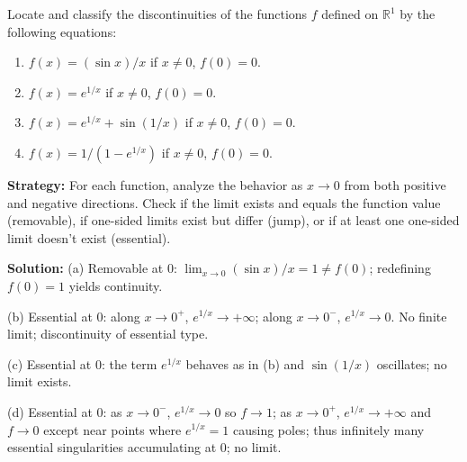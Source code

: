 \begin{problembox}
\begin{problemstatement}
Locate and classify the discontinuities of the functions $f$ defined on $\mathbb{R}^1$ by the following equations:
\begin{enumerate}[label=(\alph*)]
\item $f(x) = (\sin x)/x$ if $x \neq 0$, $f(0) = 0$.
\item $f(x) = e^{1/x}$ if $x \neq 0$, $f(0) = 0$.
\item $f(x) = e^{1/x} + \sin(1/x)$ if $x \neq 0$, $f(0) = 0$.
\item $f(x) = 1/(1 - e^{1/x})$ if $x \neq 0$, $f(0) = 0$.
\end{enumerate}
\end{problemstatement}
\end{problembox}

\noindent\textbf{Strategy:} For each function, analyze the behavior as $x \to 0$ from both positive and negative directions. Check if the limit exists and equals the function value (removable), if one-sided limits exist but differ (jump), or if at least one one-sided limit doesn't exist (essential).

\bigskip\noindent\textbf{Solution:}
(a) Removable at $0$: $\lim_{x\to0}(\sin x)/x=1\ne f(0)$; redefining $f(0)=1$ yields continuity.

(b) Essential at $0$: along $x\to 0^+$, $e^{1/x}\to+\infty$; along $x\to0^-$, $e^{1/x}\to 0$. No finite limit; discontinuity of essential type.

(c) Essential at $0$: the term $e^{1/x}$ behaves as in (b) and $\sin(1/x)$ oscillates; no limit exists.

(d) Essential at $0$: as $x\to0^-$, $e^{1/x}\to0$ so $f\to 1$; as $x\to0^+$, $e^{1/x}\to+\infty$ and $f\to 0$ except near points where $e^{1/x}=1$ causing poles; thus infinitely many essential singularities accumulating at $0$; no limit.

